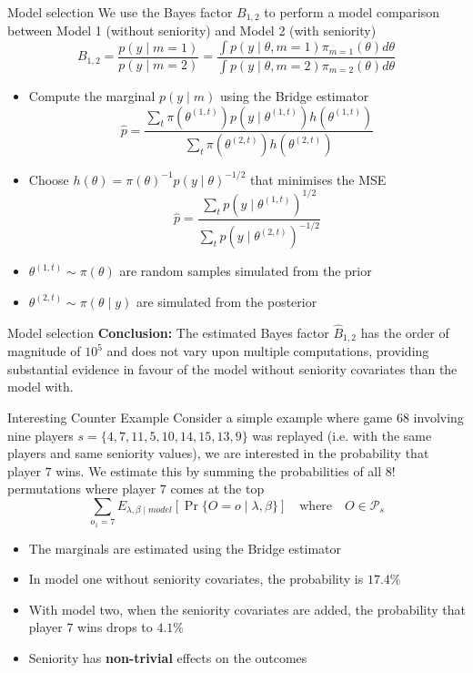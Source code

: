 \begin{frame}{Model selection}
We use the Bayes factor $B_{1,2}$ to perform a model comparison between Model 1 (without seniority) and Model 2 (with seniority)
$$
B_{1,2}=\frac{p\left(y \mid m=1\right)}{p\left(y \mid m=2\right)}=\frac{\int p\left(y \mid \theta, m=1\right) \pi_{m=1}(\theta) d \theta}{\int p(y \mid \theta, m=2) \pi_{m=2}(\theta) d \theta}
$$

\begin{itemize}
\item Compute the marginal $p(y \mid m)$ using the Bridge estimator
$$
\widehat{p}=\frac{\sum_t \pi\left(\theta^{(1, t)}\right) p\left(y \mid \theta^{(1, t)}\right) h\left(\theta^{(1, t)}\right)}{\sum_t \pi\left(\theta^{(2, t)}\right) h\left(\theta^{(2, t)}\right)}
$$
\item Choose $h(\theta)=\pi(\theta)^{-1} p(y \mid \theta)^{-1 / 2}$ that minimises the MSE
$$
\widehat{p}=\frac{\sum_t p\left(y \mid \theta^{(1, t)}\right)^{1 / 2}}{\sum_t p\left(y \mid \theta^{(2, t)}\right)^{-1 / 2}}
$$
\item $\theta^{(1, t)} \sim \pi(\theta)$ are random samples simulated from the prior
\item $\theta^{(2, t)} \sim \pi(\theta \mid y)$ are simulated from the posterior
\end{itemize}
\end{frame}

\begin{frame}{Model selection}
\textbf{Conclusion:} The estimated Bayes factor $\widehat{B}_{1,2}$ has the order of magnitude of $10^5$ and does not vary upon multiple computations, providing substantial evidence in favour of the model without seniority covariates than the model with.
\end{frame}

\begin{frame}{Interesting Counter Example}
Consider a simple example where game $68$ involving nine players $s=\{4, 7, 11, 5, 10, 14, 15, 13, 9\}$ was replayed (i.e. with the same players and same seniority values), we are interested in the probability that player $7$ wins. We estimate this by summing the probabilities of all $8!$ permutations where player $7$ comes at the top
\begin{equation*}
  \sum_{o_{1}=7} E_{\lambda, \beta \mid model} \left[ \operatorname{Pr}\{O=o \mid \lambda, \beta\} \right] \quad \text{where} \quad O \in \mathcal{P}_{s}
\end{equation*}

\begin{itemize}
\item The marginals are estimated using the Bridge estimator
\item In model one without seniority covariates, the probability is $17.4\%$
\item With model two, when the seniority covariates are added, the probability that player $7$ wins drops to $4.1\%$
\item Seniority has \textbf{non-trivial} effects on the outcomes
\end{itemize}
\end{frame}
